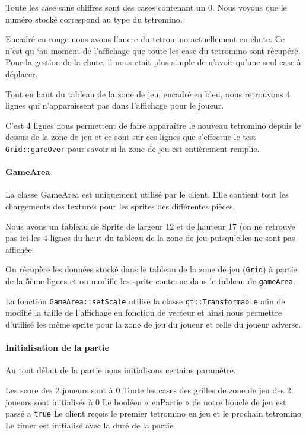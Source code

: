 \documentclass[a4paper, 12pt]{article}
\begin{document}
			Toute les case sans chiffres sont des cases contenant un 0. Nous voyons que le numéro stocké correspond au type du tetromino.

			Encadré en rouge nous avons l’ancre du tetromino actuellement en chute. Ce n’est qu ‘au moment de l’affichage que toute les case du tetromino sont récupéré. Pour la gestion de la chute, il nous etait plus simple de n’avoir qu’une seul case à déplacer. 

			Tout en haut du tableau de la zone de jeu, encadré en bleu, nous retrouvons 4 lignes qui n’apparaissent pas dans l’affichage pour le joueur.

			C’est 4 lignes nous permettent de faire apparaître le nouveau tetromino depuis le dessus de la zone de jeu et ce sont sur ces lignes que s’effectue le test \texttt{Grid::gameOver} pour savoir si la zone de jeu est entièrement remplie.


			\paragraph{GameArea}

			La classe GameArea est uniquement utilisé par le client. Elle contient tout les chargements des textures pour les sprites des différentes pièces.

			Nous avons un tableau de Sprite de largeur 12 et de hauteur 17 (on ne retrouve pas ici les 4 lignes du haut du tableau de la zone de jeu puisqu’elles ne sont pas affichée.

			On récupère les données stocké dans le tableau de la zone de jeu (\texttt{Grid}) à partie de la 5ème lignes et on modifie les sprite contenue dans le tableau de \texttt{gameArea}.

			La fonction \texttt{GameArea::setScale} utilise la classe \texttt{gf::Transformable} afin de modifié la taille de l’affichage en fonction de vecteur et ainsi nous permettre d’utilisé les même sprite pour la zone de jeu du joueur et celle du joueur adverse.

			\paragraph{Initialisation de la partie}

				Au tout début de la partie nous initialisons certains paramètre.

				Les score des 2 joueurs sont à 0
				Toute les cases des grilles de zone de jeu des 2 joueurs sont initialisés à 0
				Le booléen « enPartie » de notre boucle de jeu est passé a \texttt{true}
				Le client reçois le premier tetromino en jeu et le prochain tetromino
				Le timer est initialisé avec la duré de la partie
\end{document}
